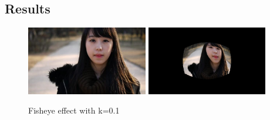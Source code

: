 \documentclass[paper=a4, fontsize=11pt]{scrartcl} %
\numberwithin{equation}{section} %
\numberwithin{figure}{section} %
\numberwithin{table}{section} %
\begin{document}
\subsection{Results}
  \begin {figure}[h!]
    \centering
    \includegraphics[clip,height=3cm]{1}
    \includegraphics[clip,height=3cm]{Fisheye01}
    \caption {Fisheye effect with k=0.1}
  \end{figure}
\end{document}
